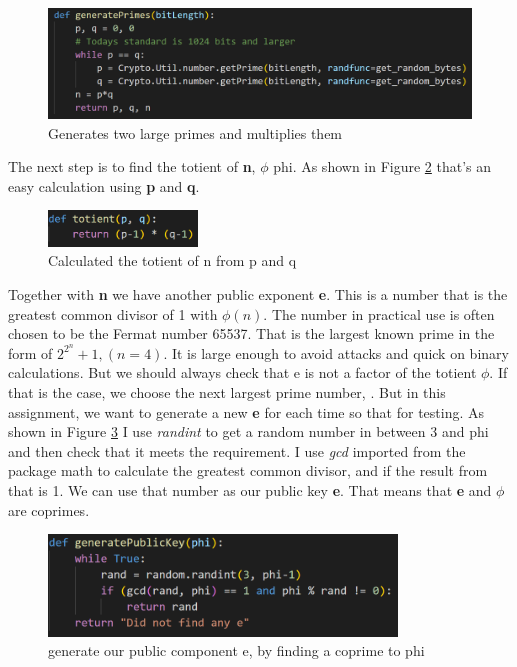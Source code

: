 \documentclass[12pt, letterpaper]{article}
\begin{document}
\begin{figure}[H]
  \includegraphics[width=\linewidth]{code_snippets/getPrimes.PNG}
  \caption{Generates two large primes and multiplies them}
  \label{fig:generatePrimes}
\end{figure}

The next step is to find the totient of \textbf{n}, $\phi$ phi. As shown in Figure \ref{fig:totient} that's an easy calculation using \textbf{p} and \textbf{q}.

\begin{figure}[H]
  \includegraphics[width=150px]{code_snippets/totient.PNG}\centering
  \caption{Calculated the totient of n from p and q}
  \label{fig:totient}
\end{figure}

Together with \textbf{n} we have another public exponent \textbf{e}. This is a number that is the greatest common divisor of 1 with $\phi(n)$. The number in practical use is often chosen to be the Fermat number 65537. That is the largest known prime in the form of $2^{2^{n}} + 1, (n=4)$. It is large enough to avoid attacks and quick on binary calculations. But we should always check that e is not a factor of the totient $\phi$. If that is the case, we choose the next largest prime number, \cite{65537}. 
But in this assignment, we want to generate a new \textbf{e} for each time so that for testing. As shown in Figure \ref{fig:e} I use \textit{randint} to get a random number in between 3 and phi and then check that it meets the requirement. I use \textit{gcd} imported from the package math to calculate the greatest common divisor, and if the result from that is 1. We can use that number as our public key \textbf{e}. That means that \textbf{e} and $\phi$ are coprimes.

\begin{figure}[H]
  \includegraphics[width=350px]{code_snippets/gene.PNG}\centering
  \caption{generate our public component e, by finding a coprime to phi}
  \label{fig:e}
\end{figure}
\end{document}
